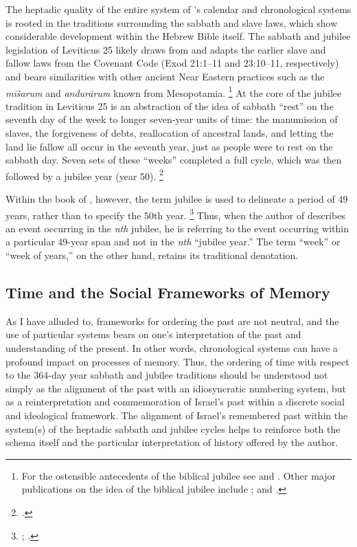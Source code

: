 The heptadic quality of the entire system of \jub's calendar and chronological systems is rooted in the traditions surrounding the sabbath and slave laws, which show considerable development within the Hebrew Bible itself. The sabbath and jubilee legislation of Leviticus 25 likely draws from and adapts the earlier slave and fallow laws from the Covenant Code (Exod 21:1--11 and 23:10--11, respectively) and bears similarities with other ancient Near Eastern practices such as the \emph{mīšarum} and \emph{andurārum} known from Mesopotamia.%
    \footnote{For the ostensible antecedents of the biblical jubilee see 
    \cite[1--51]{bergsma2007} and 
    \cite{kaplan_cbq2019}. Other major publications on the idea of the biblical jubilee include 
        \cite{north1954};
        \cite{fager1993} and 
        \cite{lefebvre2003}.}
At the core of the jubilee tradition in Leviticus 25 is an abstraction of the idea of sabbath ``rest'' on the seventh day of the week to longer seven-year units of time: the manumission of slaves, the forgiveness of debts, reallocation of ancestral lands, and letting the land lie fallow all occur in the seventh year, just as people were to rest on the sabbath day. Seven sets of these ``weeks'' completed a full cycle, which was then followed by a jubilee year (year 50).%
    \footnote{%
        \Cite[85--92]{bergsma2007}.}

Within the book of \jub, however, the term jubilee is used to delineate a period of 49 years, rather than to specify the 50th year.%
    \footnote{%
        \cite[524--525]{vanderkam-b_vanderkam2000};
        \cite[234]{bergsma2007}.}
Thus, when the author of \jub describes an event occurring in the \emph{nth} jubilee, he is referring to the event occurring within a particular 49-year span and not in the \emph{nth} ``jubilee year.'' The term ``week'' or ``week of years,'' on the other hand, retains its traditional denotation.


\subsection{Time and the Social Frameworks of Memory}
As I have alluded to, frameworks for ordering the past are not neutral, and the use of particular systems bears on one's interpretation of the past and understanding of the present. In other words, chronological systems can have a profound impact on processes of memory. Thus, the ordering of time with respect to the 364-day year sabbath and jubilee traditions should be understood not simply as the alignment of the past with an idiosyncratic numbering system, but as a reinterpretation and commemoration of Israel's past within a discrete social and ideological framework. The alignment of Israel's remembered past within the system(s) of the heptadic sabbath and jubilee cycles helps to reinforce both the schema itself and the particular interpretation of history offered by the author.

